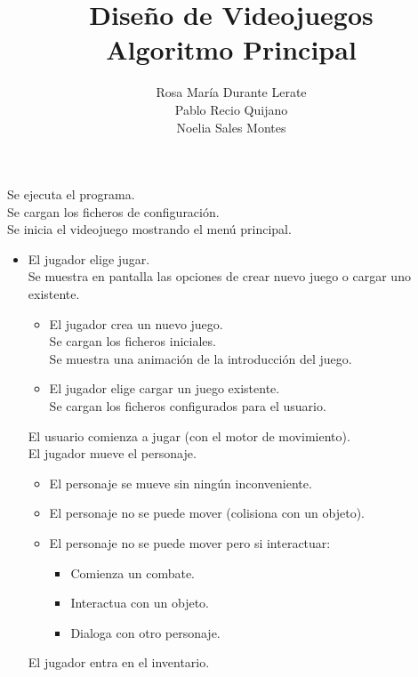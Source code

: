 \documentclass[a4paper,10pt]{article}
\title{Diseño de Videojuegos \\ Algoritmo Principal}
\author{Rosa María Durante Lerate\\Pablo Recio Quijano\\Noelia Sales Montes}
\begin{document}
\maketitle

\noindent Se ejecuta el programa. \\
Se cargan los ficheros de configuración. \\
Se inicia el videojuego mostrando el menú principal.

\begin{itemize}
\item El jugador elige jugar.\\
Se muestra en pantalla las opciones de crear nuevo juego o cargar uno existente.

\begin{itemize}
\item El jugador crea un nuevo juego. \\
Se cargan los ficheros iniciales. \\
Se muestra
  una animación de la introducción del juego.

\item El jugador elige  cargar un juego existente. \\
Se cargan los ficheros configurados
  para el usuario.
\end{itemize}

El usuario comienza a jugar (con el motor de movimiento).\\ 
El jugador mueve el personaje.

\begin{itemize}
\item El personaje se mueve sin ningún inconveniente.
\item El personaje no se puede mover (colisiona con un objeto).
\item El personaje no se puede mover pero si interactuar:

\begin{itemize}
\item Comienza un combate.

\item Interactua con un objeto.

\item Dialoga con otro personaje.  

\end{itemize}

\end{itemize}

El jugador entra en el inventario.


\end{itemize}
\end{document}
